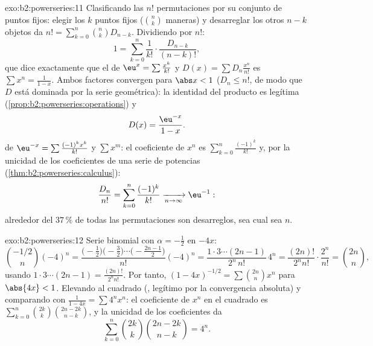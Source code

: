 \begin{solution}{exo:b2:powerseries:11}
Clasificando las $n!$ permutaciones por su conjunto de puntos fijos:
elegir los $k$ puntos fijos ($\binom nk$ maneras) y desarreglar los
otros $n - k$ objetos da $n! = \sum_{k=0}^n\binom nk D_{n-k}$.
Dividiendo por $n!$:
\[
1 = \sum_{k=0}^{n}\frac{1}{k!}\cdot\frac{D_{n-k}}{(n-k)!} ,
\]
que dice exactamente que el  de $\eu^x =
\sum\frac{x^k}{k!}$ y $D(x) = \sum D_n\frac{x^n}{n!}$ es $\sum x^n =
\frac{1}{1-x}$. Ambos factores convergen  para $\abs x
< 1$ ($D_n \leq n!$, de modo que $D$ está dominada por la serie
geométrica): la identidad del producto es legítima
(\cref{prop:b2:powerseries:operations}) y
\[
D(x) = \frac{\eu^{-x}}{1-x} .
\]
 de $\eu^{-x} = \sum\frac{(-1)^kx^k}{k!}$ y
$\sum x^m$: el coeficiente de $x^n$ es
$\sum_{k=0}^{n}\frac{(-1)^k}{k!}$ y, por la unicidad de los
coeficientes de una serie de potencias
(\cref{thm:b2:powerseries:calculus}):
\[
\frac{D_n}{n!} = \sum_{k=0}^{n}\frac{(-1)^k}{k!}
\xrightarrow[n\to\infty]{} \eu^{-1} :
\]
alrededor del $37\,\%$ de todas las permutaciones son desarreglos,
sea cual sea $n$.
\end{solution}

\begin{solution}{exo:b2:powerseries:12}
Serie binomial con $\alpha = -\frac12$ en $-4x$:
\[
\binom{-1/2}{n}(-4)^n
= \frac{\bigl(-\frac12\bigr)\bigl(-\frac32\bigr)\cdots
\bigl(-\frac{2n-1}2\bigr)}{n!}(-4)^n
= \frac{1\cdot3\cdots(2n-1)}{2^n\,n!}\,4^n
= \frac{(2n)!}{2^n n!}\cdot\frac{2^n}{n!}
= \binom{2n}{n},
\]
usando $1\cdot3\cdots(2n-1) = \frac{(2n)!}{2^nn!}$. Por tanto,
$(1-4x)^{-1/2} = \sum\binom{2n}nx^n$ para $\abs{4x} < 1$. Elevando
al cuadrado (, legítimo por la convergencia
absoluta) y comparando con $\frac{1}{1-4x} = \sum 4^nx^n$: el
coeficiente de $x^n$ en el cuadrado es
$\sum_{k=0}^n\binom{2k}k\binom{2n-2k}{n-k}$, y la unicidad de los
coeficientes da
\[
\sum_{k=0}^{n}\binom{2k}{k}\binom{2n-2k}{n-k} = 4^n .
\]
\end{solution}

